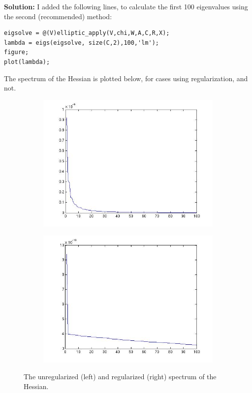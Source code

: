 \documentclass[11pt]{article}
\newenvironment{solution}{\begin{trivlist}\item[]{\bf Solution:}}
                      {\end{trivlist}}
\begin{document}
\begin{enumerate}
\begin{solution}
I added the following lines, to calculate the first 100 eigenvalues using
 the second (recommended) method: 
\begin{lstlisting}
eigsolve = @(V)elliptic_apply(V,chi,W,A,C,R,X);
lambda = eigs(eigsolve, size(C,2),100,'lm');
figure;
plot(lambda);
\end{lstlisting}
The spectrum of the Hessian is plotted below, for cases using regularization,
 and not. 
 \begin{figure}[!htb]
  \centering
  \begin{subfigure}[bh]{0.45\textwidth}
   \includegraphics[width=\textwidth]{figs/noreg.jpg}
  \end{subfigure}%
  \begin{subfigure}[bh]{0.45\textwidth}
   \includegraphics[width=\textwidth]{figs/regularization.jpg}
  \end{subfigure}
  \caption{The unregularized (left) and regularized (right) spectrum of
  the Hessian. }
 \end{figure}


\end{solution}
\end{enumerate}
\end{document}
